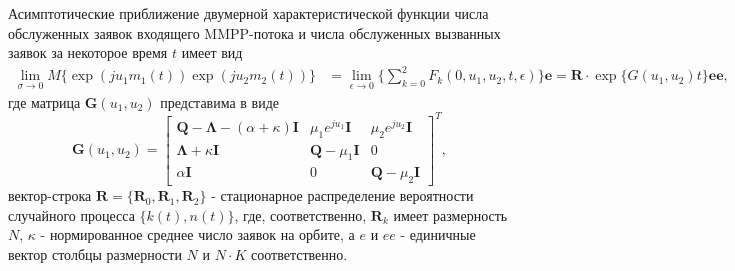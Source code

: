 \begin{theorem} \label{mmpp_theorem}
	Асимптотические приближение двумерной характеристической функции числа обслуженных заявок входящего MMPP-потока и числа обслуженных вызванных заявок за некоторое время $t$ имеет вид
	\begin{equation*} \label{theorem_twodim_map}
		\begin{split}
		  \lim_{\sigma \xrightarrow{} 0} M\{\exp(ju_{1}m_{1}(t))\exp(ju_{2}m_{2}(t))\} &= 
			 \lim_{\epsilon \xrightarrow{} 0} \{ \sum_{k=0}^{2}F_{k}(0,u_{1},u_{2},t,\epsilon) \}\boldsymbol{e} = \boldsymbol{R} \cdot \exp\{G(u_{1},u_{2})t\}\boldsymbol{ee},
		\end{split}
	\end{equation*}
	где матрица $\boldsymbol{G}(u_{1},u_{2})$ представима в виде
	\begin{equation*}
		\boldsymbol{G}(u_{1},u_{2})=\begin{bmatrix}
			\boldsymbol{Q}-\boldsymbol{\Lambda}-(\alpha + \kappa)\boldsymbol{I} & \mu_{1}e^{ju_{1}}\boldsymbol{I} &  \mu_{2}e^{ju_{2}}\boldsymbol{I}\\
			\boldsymbol{\Lambda}+\kappa\boldsymbol{I} & \boldsymbol{Q}-\mu_{1}\boldsymbol{I} & 0\\
			\alpha\boldsymbol{I} & 	0 &	\boldsymbol{Q}-\mu_{2}\boldsymbol{I}
		\end{bmatrix}^{T},
	\end{equation*}
	вектор-строка $\boldsymbol{R}=\{\boldsymbol{R}_{0},\boldsymbol{R}_{1},\boldsymbol{R}_{2}\}$ - стационарное распределение вероятности случайного процесса $\{k(t),n(t)\}$, где, соответственно,  $\boldsymbol{R}_{k}$ имеет размерность $N$, $\kappa$ - нормированное среднее число заявок на орбите, а $e$ и $ee$ - единичные вектор столбцы размерности $N$ и $N \cdot K$ соответственно.
\end{theorem}
